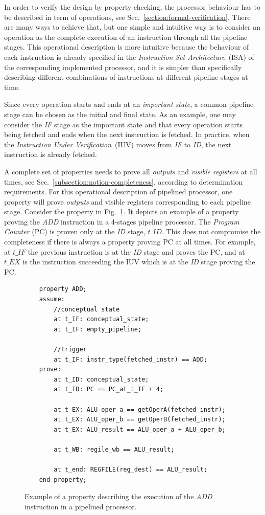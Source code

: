 In order to verify the design by property checking, the processor behaviour has to be described in term of operations, see Sec.~\ref{section:formal-verification}. There are many ways to achieve that, but one simple and intuitive way is to consider an operation as the complete execution of an instruction through all the pipeline stages. This operational description is more intuitive because the behaviour of each instruction is already specified in the \textit{Instruction Set Architecture}~(ISA) of the corresponding implemented processor, and it is simpler than specifically describing different combinations of instructions at different pipeline stages at time.

Since every operation starts and ends at an \textit{important state}, a common pipeline stage can be chosen as the initial and final state. As an example, one may consider the \textit{IF} stage as the important state and that every operation starts being fetched and ends when the next instruction is fetched. In practice, when the \textit{Instruction Under Verification}~(IUV) moves from \textit{IF} to \textit{ID}, the next instruction is already fetched.

A complete set of properties needs to prove all \textit{outputs} and \textit{visible registers} at all times, see Sec.~\ref{subsection:notion-completeness}, according to determination requirements. For this operational description of pipelined processor, one property will prove \textit{outputs} and visible registers corresponding to each pipeline stage. Consider the property in Fig.~\ref{fig:ex-add-ppt}. It depicts an example of a property proving the \textit{ADD} instruction in a 4-stages pipeline processor. The \textit{Program Counter} (PC) is proven only at the \textit{ID} stage, $t\_ID$. This does not compromise the completeness if there is always a property proving PC at all times. For example, at $t\_IF$ the previous instruction is at the \textit{ID} stage and proves the PC, and at $t\_EX$ is the instruction succeeding the IUV which is at the \textit{ID} stage proving the PC.

\begin{figure}[htb!]
    \begin{lstlisting}
    property ADD;
    assume:
        //conceptual state
        at t_IF: conceptual_state;
        at t_IF: empty_pipeline;
    
        //Trigger
        at t_IF: instr_type(fetched_instr) == ADD;
    prove:
        at t_ID: conceptual_state;
        at t_ID: PC == PC_at_t_IF + 4;
    
        at t_EX: ALU_oper_a == getOperA(fetched_instr);
        at t_EX: ALU_oper_b == getOperB(fetched_instr);
        at t_EX: ALU_result == ALU_oper_a + ALU_oper_b;
        
        at t_WB: regile_wb == ALU_result;
    
        at t_end: REGFILE(reg_dest) == ALU_result;
    end property;\end{lstlisting}
    \caption{Example of a property describing the execution of the \textit{ADD} instruction in a pipelined processor.}
    \label{fig:ex-add-ppt}
\end{figure}

